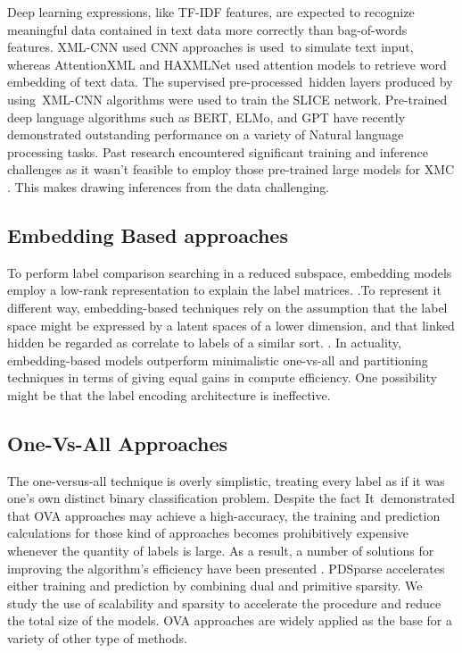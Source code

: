 \documentclass[a4paper]{article}
\begin{document}
Deep learning expressions, like TF-IDF features, are expected to recognize meaningful data contained in text data more correctly than bag-of-words features. XML-CNN used CNN approaches is used to simulate text input, whereas AttentionXML and HAXMLNet used attention models to retrieve word embedding of text data. The supervised pre-processed hidden layers produced by using XML-CNN algorithms were used to train the SLICE network. Pre-trained deep language algorithms such as BERT, ELMo, and GPT have recently demonstrated outstanding performance on a variety of Natural language processing tasks. Past research encountered significant training and inference challenges as it wasn't feasible to employ those pre-trained large models for XMC \cite{bib3}. This makes drawing inferences from the data challenging.

\subsection{Embedding Based approaches}
To perform label comparison searching in a reduced subspace, embedding models employ a low-rank representation to explain the label matrices. \cite{bib6}.To represent it different way, embedding-based techniques rely on the assumption that the label space might be expressed by a latent spaces of a lower dimension, and that linked hidden be regarded as correlate to labels of a similar sort. \cite{bib5}. In actuality, embedding-based models outperform minimalistic one-vs-all and partitioning techniques in terms of giving equal gains in compute efficiency. One possibility might be that the label encoding architecture is ineffective.

\subsection{One-Vs-All Approaches}
The one-versus-all technique is overly simplistic, treating every label as if it was one's own distinct binary classification problem. Despite the fact It demonstrated that OVA approaches may achieve a high-accuracy, the training and prediction calculations for those kind of approaches becomes prohibitively expensive whenever the quantity of labels is large. As a result, a number of solutions for improving the algorithm's efficiency have been presented \cite{bib5}. PDSparse accelerates either training and prediction by combining dual and primitive sparsity. We study the use of scalability and sparsity to accelerate the procedure and reduce the total size of the models. OVA approaches are widely applied as the base for a variety of other type of methods.
\end{document}
